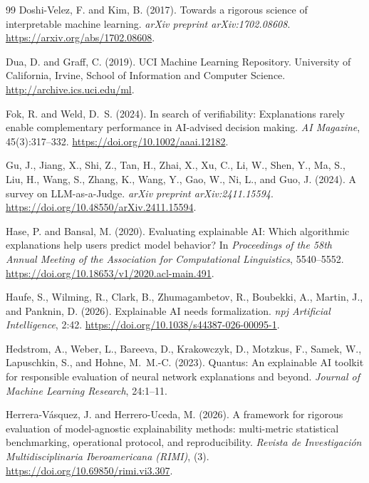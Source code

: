 \documentclass[10pt,a4paper,twoside]{article}
\begin{document}
\begin{thebibliography}{99}
Doshi-Velez, F. and Kim, B. (2017).
Towards a rigorous science of interpretable machine learning.
\emph{arXiv preprint arXiv:1702.08608}.
\url{https://arxiv.org/abs/1702.08608}.

Dua, D. and Graff, C. (2019).
{UCI} Machine Learning Repository.
University of California, Irvine, School of Information and Computer Science.
\url{http://archive.ics.uci.edu/ml}.

Fok, R. and Weld, D.~S. (2024).
In search of verifiability: Explanations rarely enable complementary
performance in AI-advised decision making.
\emph{AI Magazine}, 45(3):317--332.
\url{https://doi.org/10.1002/aaai.12182}.

Gu, J., Jiang, X., Shi, Z., Tan, H., Zhai, X., Xu, C., Li, W., Shen, Y.,
Ma, S., Liu, H., Wang, S., Zhang, K., Wang, Y., Gao, W., Ni, L., and
Guo, J. (2024).
A survey on LLM-as-a-Judge.
\emph{arXiv preprint arXiv:2411.15594}.
\url{https://doi.org/10.48550/arXiv.2411.15594}.

Hase, P. and Bansal, M. (2020).
Evaluating explainable {AI}: Which algorithmic explanations help users
predict model behavior?
In \emph{Proceedings of the 58th Annual Meeting of the Association for
Computational Linguistics}, 5540--5552.
\url{https://doi.org/10.18653/v1/2020.acl-main.491}.

Haufe, S., Wilming, R., Clark, B., Zhumagambetov, R., Boubekki, A.,
Martin, J., and Panknin, D. (2026).
Explainable {AI} needs formalization.
\emph{npj Artificial Intelligence}, 2:42.
\url{https://doi.org/10.1038/s44387-026-00095-1}.

Hedstrom, A., Weber, L., Bareeva, D., Krakowczyk, D., Motzkus, F.,
Samek, W., Lapuschkin, S., and Hohne, M.~M.-C. (2023).
Quantus: An explainable AI toolkit for responsible evaluation of neural
network explanations and beyond.
\emph{Journal of Machine Learning Research}, 24:1--11.

Herrera-V\'asquez, J. and Herrero-Uceda, M. (2026).
A framework for rigorous evaluation of model-agnostic explainability
methods: multi-metric statistical benchmarking, operational protocol, and
reproducibility.
\emph{Revista de Investigaci\'on Multidisciplinaria Iberoamericana (RIMI)},
(3).
\url{https://doi.org/10.69850/rimi.vi3.307}.


\end{thebibliography}
\end{document}
